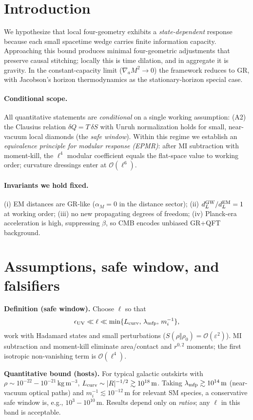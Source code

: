 \documentclass[aps,prd,preprint,onecolumn,longbibliography,nofootinbib]{revtex4-2}
\theoremstyle{plain}
\theoremstyle{remark}
\newcommand{\alM}{\alpha_{\!M}}
\newcommand{\be}{\beta}
\newcommand{\order}[1]{\mathcal{O}\!\left(#1\right)}
\begin{document}
\section{Introduction}
We hypothesize that local four-geometry exhibits a \emph{state-dependent} response because each small spacetime wedge carries finite information capacity. Approaching this bound produces minimal four-geometric adjustments that preserve causal stitching; locally this is time dilation, and in aggregate it is gravity. In the constant-capacity limit ($\nabla_a M^2\!\to\!0$) the framework reduces to GR, with Jacobson's horizon thermodynamics as the stationary-horizon special case.

\paragraph*{Conditional scope.}
All quantitative statements are \emph{conditional} on a single working assumption: (A2) the Clausius relation $\delta Q=T\,\delta S$ with Unruh normalization holds for small, near-vacuum local diamonds (the \emph{safe window}). Within this regime we establish an \emph{equivalence principle for modular response (EPMR)}: after MI subtraction with moment-kill, the $\ell^4$ modular coefficient equals the flat-space value to working order; curvature dressings enter at $\mathcal{O}(\ell^6)$.

\paragraph*{Invariants we hold fixed.}
(i) EM distances are GR-like ($\alM=0$ in the distance sector); (ii) $d_L^{\rm GW}/d_L^{\rm EM}=1$ at working order; (iii) no new propagating degrees of freedom; (iv) Planck-era acceleration is high, suppressing $\be$, so CMB encodes unbiased GR+QFT background.

\section{Assumptions, safe window, and falsifiers}\label{sec:safewindow}
\textbf{Definition (safe window).} Choose $\ell$ so that
\[
\epsilon_{\rm UV}\ll \ell \ll \min\{L_{\rm curv},\,\lambda_{\rm mfp},\,m_i^{-1}\},
\]
work with Hadamard states and small perturbations ($S(\rho\Vert\rho_0)=\order{\varepsilon^2}$). MI subtraction and moment-kill eliminate area/contact and $r^{0,2}$ moments; the first isotropic non-vanishing term is $\order{\ell^4}$.

\textbf{Quantitative bound (hosts).} For typical galactic outskirts with $\rho\sim10^{-22}\!-\!10^{-21}\,\mathrm{kg\,m^{-3}}$, $L_{\rm curv}\sim |R|^{-1/2}\gtrsim 10^{18}\,\mathrm{m}$. Taking $\lambda_{\rm mfp}\gtrsim 10^{14}\,\mathrm{m}$ (near-vacuum optical paths) and $m_i^{-1}\lesssim 10^{-12}\,\mathrm{m}$ for relevant SM species, a conservative safe window is, e.g., $10^3\!-\!10^{10}\,\mathrm{m}$. Results depend only on \emph{ratios}; any $\ell$ in this band is acceptable.
\end{document}
